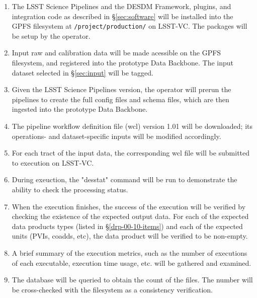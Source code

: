 \begin{enumerate}

  \item{The LSST Science Pipelines and the DESDM Framework, plugins, and integration code as described in \S\ref{sec:software}  will be installed into the GPFS filesystem at \texttt{/project/production/} on LSST-VC. The packages will be setup by the operator.}
  \item{Input raw and calibration data will be made acessible on the GPFS filesystem, and registered into the prototype Data Backbone. The input dataset selected in \S\ref{sec:input} will be tagged.}
  \item{Given the LSST Science Pipelines version, the operator will prerun the pipelines to create the full config files and schema files, which are then ingested into the prototype Data Backbone.}
  \item{The pipeline workflow definition file (wcl) version 1.01 will be downloaded; its operations- and dataset-specific inputs will be modified accordingly.}
  \item{For each tract of the input data, the corresponding wcl file will be submitted to execution on LSST-VC.}
  \item{During exeuction, the "desstat" command will be run to demonstrate the ability to check the processing status.}
  \item{When the execution finishes, the success of the execution will be verified by checking the existence of the expected output data.
  For each of the expected data products types (listed in \S\ref{drp-00-10-items})
  and each of the expected units (PVIs, coadds, etc), the data product will be
  verified to be non-empty.}
  \item{A brief summary of the execution metrics, such as the number of executions of each executable, execution time usage, etc. will be gathered and examined.}
  \item{The database will be queried to obtain the count of the files. The number will be cross-checked with the filesystem as a consistency verification.}

\end{enumerate}
